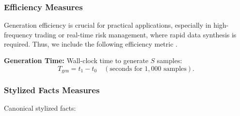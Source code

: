           \subsubsection{Efficiency Measures}
          Generation efficiency is crucial for practical applications,
          especially in high-frequency trading or real-time risk
          management, where rapid data synthesis is required.
          Thus, we include the following efficiency metric \cite{Stenger24}.
          \begin{enumerate}[label=\textbf{[M\arabic*]}, resume]
          \item \label{metric:gentime} \textbf{Generation Time:}  
          Wall-clock time to generate \(S\) samples:
          \[
          T_{\mathrm{gen}} = t_1 - t_0 \quad (\text{seconds for } 1,000
          \text{ samples}).
          \]
          \end{enumerate}
          
          \subsubsection{Stylized Facts Measures} \label{sec:stylized-facts}
          Canonical stylized facts:
          
